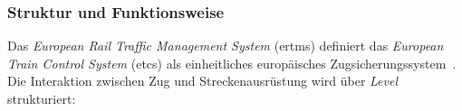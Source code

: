 \documentclass[runningheads]{res/llncs}
\begin{document}
\subsubsection{Struktur und Funktionsweise}
\label{sec:Struktur_und_Funktionsweise}
Das \textit{European Rail Traffic Management System} (\gls{ertms}) definiert das \textit{European Train Control System} (\gls{etcs}) als einheitliches europäisches Zugsicherungssystem~\parencite[S. 58]{trinckaufETCS2024}. Die Interaktion zwischen Zug und Streckenausrüstung wird über \textit{Level} strukturiert:

\end{document}
